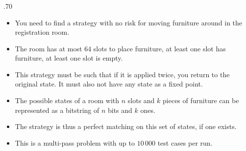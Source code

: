 \begin{frame}
    \frametitle{\problemtitle}

    \begin{columns}
        \begin{column}[T]{.70\textwidth}
            \begin{itemize}
              \item You need to find a strategy with no risk for moving furniture around in the registration room.
              \item The room has at most $64$ slots to place furniture, at least one slot has furniture, at least one slot is empty.
              \item This strategy must be such that if it is applied twice, you return to the original state. It must also not have any state as a fixed point.
              \item The possible states of a room with $n$ slots and $k$ pieces of furniture can be represented as a bitstring of $n$ bits and $k$ ones.
              \item The strategy is thus a perfect matching on this set of states, if one exists.
              \item This is a multi-pass problem with up to $10\,000$ test cases per run.
            \end{itemize}
        \end{column}

    \end{columns}
\end{frame}
